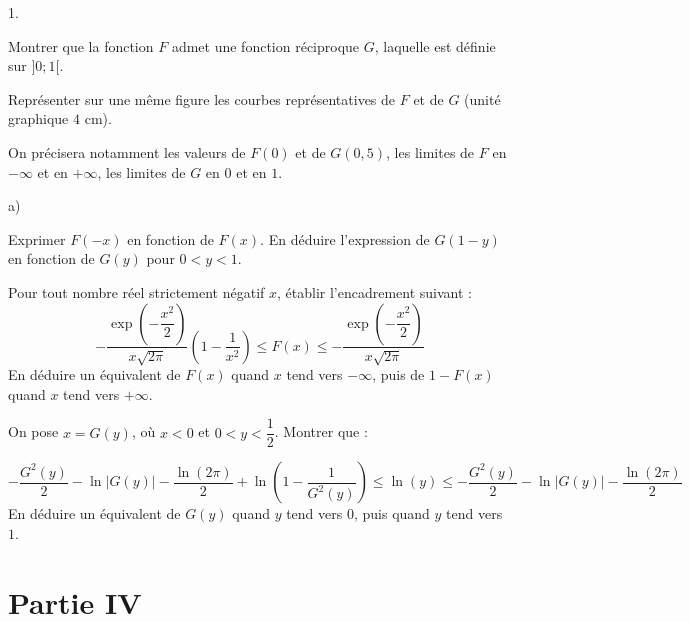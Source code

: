 \documentclass[11pt]{article}%
\begin{document}
\begin{noliste}{1.}
 \setlength{\itemsep}{4mm}
\item Montrer que la fonction $F$ admet une fonction réciproque $G$,
laquelle est définie sur $]0;1[$.

\item Représenter sur une même figure les courbes représentatives de $F
$ et de $G$ (unité graphique $4$ cm).

On précisera notamment les valeurs de $F(0)$ et de $G(0,5)$, les
limites
de $F$ en $-\infty$ et en $ + \infty$, les limites de $G$ en $0$ et en
$1$.

\item 

\begin{noliste}{a)}
 \setlength{\itemsep}{2mm}
\item Exprimer $F(-x)$ en fonction de $F(x)$. En déduire l'expression
de $G(1-y)$ en fonction de $G(y)$ pour $0<y<1$.

\item Pour tout nombre réel strictement négatif $x$, établir
l'encadrement
suivant : 
\[
-\dfrac{\exp \left( -\dfrac{x^{2}}{2}\right) }{x\sqrt{2\pi }}\left(
1-\dfrac{1}{x^{2}}\right) \leq F(x)\leq -\dfrac{\exp \left(
-\dfrac{x^{2}}{2}\right) }{x\sqrt{2\pi }}
\]
En déduire un équivalent de $F(x)$ quand $x$ tend vers $-\infty $, puis
de $1-F(x)$ quand $x$ tend vers $ + \infty $.

\item On pose $x = G(y)$, où $x<0$ et $0<y<\dfrac{1}{2}$. Montrer que :

\[
-\dfrac{G^{2}(y)}{2}-\ln \left| G(y)\right| -\dfrac{\ln (2\pi )}{2} +
\ln \left( 1-\dfrac{1}{G^{2}(y)}\right) \leq \ln (y)\leq
-\dfrac{G^{2}(y)}{2}-\ln \left| G(y)\right| -\dfrac{\ln (2\pi )}{2}
\]
En déduire un équivalent de $G(y)$ quand $y$ tend vers $0$, puis quand
$y$
tend vers $1$.
\end{noliste}
\end{noliste}

\section*{Partie IV}
\end{document}
